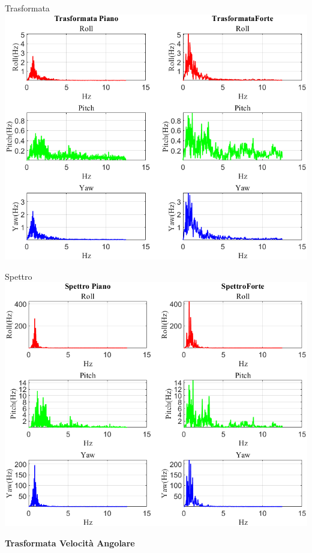 	\begin{frame}{{Trasformata}}
		\centering\includegraphics[height=.8\textheight]{figure/VAng/Trasformata/Trasformata}
	\end{frame}
	
	\begin{frame}{{Spettro}}
		\centering\includegraphics[height=.8\textheight]{figure/VAng/Trasformata/Spettro}
	\end{frame}
	
	\begin{frame}
		\color{blue}\centering\huge{\textbf{Trasformata Velocità Angolare}}
	\end{frame}
	
